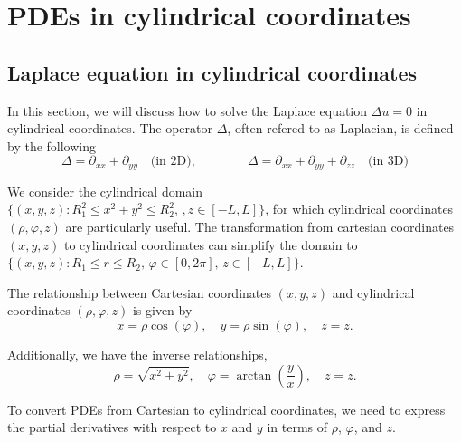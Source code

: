 \section{PDEs in cylindrical coordinates}

\subsection{Laplace equation in cylindrical coordinates}

In this section, we will discuss how to solve the Laplace equation $\Delta u = 0$ in cylindrical coordinates. The operator $\Delta$, often refered to as Laplacian, is defined by the following
\begin{equation}\label{eq.Laplacian}
    \Delta = \partial_{xx} + \partial_{yy} \quad \textrm{(in 2D)},\qquad\qquad \Delta = \partial_{xx} + \partial_{yy} + \partial_{zz} \quad \textrm{(in 3D)}
\end{equation}

We consider the cylindrical domain $\{(x, y, z): R_1^2\le x^2 + y^2 \le R_2^2,\,, z\in [-L, L]\}$, for which cylindrical coordinates $(\rho, \varphi, z)$ are particularly useful. The transformation from cartesian coordinates $(x, y, z)$ to cylindrical coordinates can simplify the domain to $\{(x, y, z): R_1\le r \le R_2,\,\varphi\in [0, 2\pi],\,z\in [-L, L]\}$.

The relationship between Cartesian coordinates $(x, y, z)$ and cylindrical coordinates $(\rho, \varphi, z)$ is given by
\begin{equation}\label{eq.from_cartesian_to_cylindrical}
    x = \rho \cos(\varphi), \quad y = \rho \sin(\varphi), \quad z = z.
\end{equation}

Additionally, we have the inverse relationships,
\begin{equation}\label{eq.from_cylindrical_to_cartesian}
    \rho = \sqrt{x^2 + y^2}, \quad \varphi = \arctan\left(\frac{y}{x}\right), \quad z = z.
\end{equation}

To convert PDEs from Cartesian to cylindrical coordinates, we need to express the partial derivatives with respect to $x$ and $y$ in terms of $\rho$, $\varphi$, and $z$.

